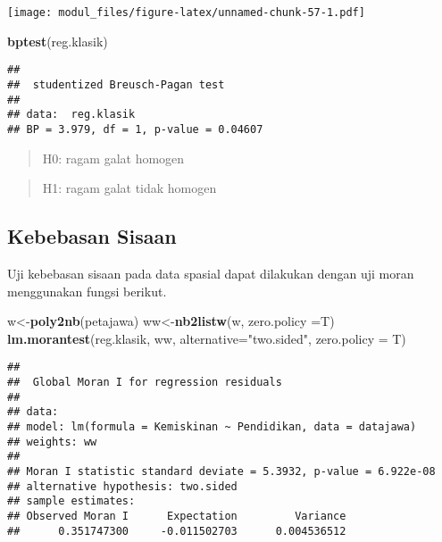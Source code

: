 \documentclass[
]{book}
\newenvironment{Shaded}{\begin{snugshade}}{\end{snugshade}}
\newcommand{\DataTypeTok}[1]{\textcolor[rgb]{0.13,0.29,0.53}{#1}}
\newcommand{\KeywordTok}[1]{\textcolor[rgb]{0.13,0.29,0.53}{\textbf{#1}}}
\newcommand{\NormalTok}[1]{#1}
\newcommand{\StringTok}[1]{\textcolor[rgb]{0.31,0.60,0.02}{#1}}
\begin{document}
\texttt{[image: modul\_files/figure-latex/unnamed-chunk-57-1.pdf]}

\begin{Shaded}
\begin{Highlighting}[]
\KeywordTok{bptest}\NormalTok{(reg.klasik)}
\end{Highlighting}
\end{Shaded}

\begin{verbatim}
## 
##  studentized Breusch-Pagan test
## 
## data:  reg.klasik
## BP = 3.979, df = 1, p-value = 0.04607
\end{verbatim}

\begin{quote}
H0: ragam galat homogen
\end{quote}

\begin{quote}
H1: ragam galat tidak homogen
\end{quote}

\hypertarget{kebebasan-sisaan}{%
\subsection{Kebebasan Sisaan}\label{kebebasan-sisaan}}

Uji kebebasan sisaan pada data spasial dapat dilakukan dengan uji moran menggunakan fungsi berikut.

\begin{Shaded}
\begin{Highlighting}[]
\NormalTok{w\textless{}{-}}\KeywordTok{poly2nb}\NormalTok{(petajawa)}
\NormalTok{ww\textless{}{-}}\KeywordTok{nb2listw}\NormalTok{(w, }\DataTypeTok{zero.policy =}\NormalTok{T)}
\KeywordTok{lm.morantest}\NormalTok{(reg.klasik, ww, }\DataTypeTok{alternative=}\StringTok{"two.sided"}\NormalTok{, }\DataTypeTok{zero.policy =}\NormalTok{ T)}
\end{Highlighting}
\end{Shaded}

\begin{verbatim}
## 
##  Global Moran I for regression residuals
## 
## data:  
## model: lm(formula = Kemiskinan ~ Pendidikan, data = datajawa)
## weights: ww
## 
## Moran I statistic standard deviate = 5.3932, p-value = 6.922e-08
## alternative hypothesis: two.sided
## sample estimates:
## Observed Moran I      Expectation         Variance 
##      0.351747300     -0.011502703      0.004536512
\end{verbatim}
\end{document}
